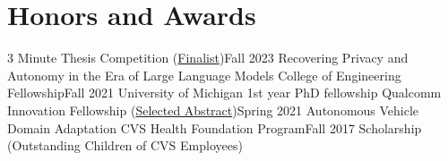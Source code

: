 \section{Honors and Awards}
  \CVSubHeadingListStart
    \CVSubheading
      {3 Minute Thesis Competition (\underline{Finalist})}{Fall 2023}
      {Recovering Privacy and Autonomy in the Era of Large Language Models}{}
    \CVSubheading
      {College of Engineering Fellowship}{Fall 2021}
      {University of Michigan 1st year PhD fellowship}{}
    \CVSubheading
      {Qualcomm Innovation Fellowship (\underline{Selected Abstract})}{Spring 2021}
      {Autonomous Vehicle Domain Adaptation}{}
    \CVSubheading
      {CVS Health Foundation Program}{Fall 2017}
      {Scholarship (Outstanding Children of CVS Employees)}{}
  \CVSubHeadingListEnd